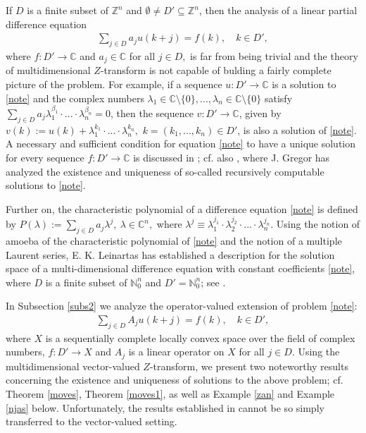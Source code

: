 \documentclass{amsart}
\theoremstyle{definition}
\theoremstyle{remark}
\numberwithin{equation}{section}
\begin{document}
If $D$ is a finite subset of ${\mathbb Z}^{n}$ and $\emptyset \neq D' \subseteq {\mathbb Z}^{n}$, then the analysis of a linear partial difference equation
\begin{align}\label{note}
\sum_{j\in D}a_{j}u(k+j)=f(k),\quad k\in D',
\end{align}
where $f : D' \rightarrow {\mathbb C}$ and $a_{j}\in {\mathbb C}$ for all $j\in D,$ is far from being trivial and the theory of multidimensional $Z$-transform is not capable of bulding a fairly complete picture of the problem. For example, if a sequence $u : D'\rightarrow {\mathbb C}$ is a solution to \eqref{note} and the complex numbers $\lambda_{1}\in {\mathbb C} \setminus \{0\},...,\lambda_{n}\in {\mathbb C} \setminus \{0\}$ satisfy $\sum_{j\in D}a_{j}\lambda_{1}^{\beta_{1}}\cdot ... \cdot \lambda_{n}^{\beta_{n}}=0$, then the 
sequence $v : D' \rightarrow {\mathbb C}$, given by $v(k):=u(k)+\lambda_{1}^{k_{1}}\cdot ... \cdot \lambda_{n}^{k_{n}}, $ $k=(k_{1},...,k_{n})\in D'$,
is also a solution of \eqref{note}. A necessary and sufficient condition for equation \eqref{note} to have a unique solution for every sequence $f : D' \rightarrow {\mathbb C}$ is discussed in \cite[Theorem 3.2.2]{gregor}; cf. also \cite[Theorem 4.1.1a, Theorem 4.1.1]{gregor}, where J. Gregor has analyzed the existence and uniqueness of so-called recursively computable solutions to \eqref{note}. 

Further on, the characteristic polynomial of a difference equation \eqref{note}
is defined by
$
P(\lambda):=\sum_{j \in D}a_{j}\lambda^{j},\ \lambda \in {\mathbb C}^{n},
$
where $\lambda^{j}\equiv \lambda_{1}^{j_{1}}\cdot \lambda_{2}^{j_{2}}\cdot ... \cdot \lambda_{n}^{j_{n}}.$ Using the notion of amoeba of the characteristic polynomial of \eqref{note} and the notion of a multiple Laurent series, E. K. Leinartas has established
a description for the solution space of a multi-dimensional difference equation with constant
coefficients \eqref{note}, where $D$ is a finite subset of ${\mathbb N}_{0}^{n}$ and $D' ={\mathbb N}_{0}^{n}$; see \cite[Theorem 1, Theorem 2]{198}.

In Subsection \ref{subs2} we analyze the operator-valued extension of problem \eqref{note}:
\begin{align*}
\sum_{j\in D}A_{j}u(k+j)=f(k),\quad k\in D',
\end{align*}
where $X$ is a sequentially complete locally convex space over the field of complex numbers, $f : D' \rightarrow X$ and $A_{j}$ is a linear operator on $X$ for all $j\in D.$ Using the multidimensional vector-valued $Z$-transform, we present two noteworthy results concerning the existence and uniqueness of solutions to the above problem; cf. Theorem \ref{moves}, Theorem \ref{moves1}, as well as Example \ref{zan} and Example \ref{njas} below. Unfortunately, the results established in \cite{198} cannot be so simply transferred to the vector-valued setting.
\end{document}
